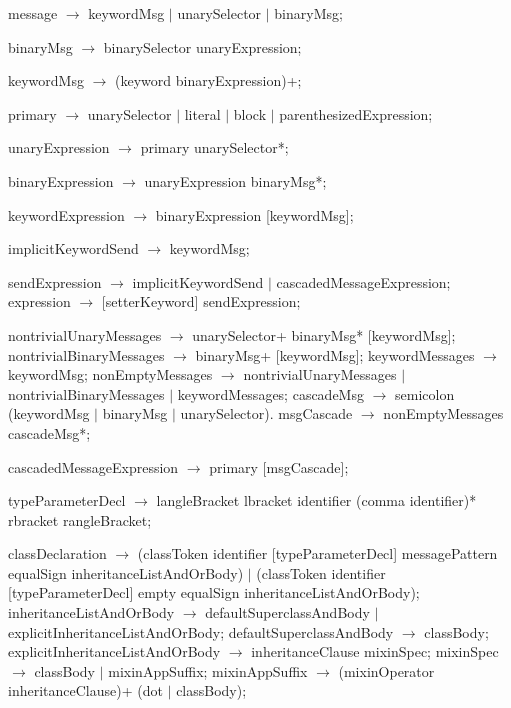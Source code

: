 \documentclass{article}
\begin{document}
\begin{newspeak}
message $\rightarrow$ keywordMsg $|$ unarySelector $|$ binaryMsg;

binaryMsg $\rightarrow$ binarySelector unaryExpression;

keywordMsg $\rightarrow$  (keyword binaryExpression)+;

primary $\rightarrow$  unarySelector $|$
               literal $|$
               block $|$ 
               parenthesizedExpression;
 
unaryExpression $\rightarrow$ primary unarySelector*;

binaryExpression $\rightarrow$  unaryExpression binaryMsg*;

keywordExpression $\rightarrow$  binaryExpression [keywordMsg];

implicitKeywordSend $\rightarrow$ keywordMsg;

sendExpression $\rightarrow$ implicitKeywordSend $|$ cascadedMessageExpression; 
expression $\rightarrow$ [setterKeyword] sendExpression;

nontrivialUnaryMessages $\rightarrow$ unarySelector+ binaryMsg*  [keywordMsg];
nontrivialBinaryMessages $\rightarrow$ binaryMsg+ [keywordMsg];
keywordMessages $\rightarrow$ keywordMsg;
nonEmptyMessages $\rightarrow$ nontrivialUnaryMessages $|$
                             nontrivialBinaryMessages  $|$
                             keywordMessages;
cascadeMsg $\rightarrow$ semicolon (keywordMsg $|$ binaryMsg $|$ unarySelector).
msgCascade $\rightarrow$ nonEmptyMessages cascadeMsg*;
                                                                                                                        
cascadedMessageExpression $\rightarrow$ primary [msgCascade]; 

typeParameterDecl $\rightarrow$ langleBracket lbracket identifier (comma identifier)* rbracket rangleBracket;

classDeclaration $\rightarrow$ (classToken identifier [typeParameterDecl] messagePattern equalSign
                     inheritanceListAndOrBody) $|$
                  (classToken identifier [typeParameterDecl] empty equalSign
                     inheritanceListAndOrBody);
inheritanceListAndOrBody $\rightarrow$ defaultSuperclassAndBody $|$ 
                                     explicitInheritanceListAndOrBody;
defaultSuperclassAndBody $\rightarrow$ classBody;
explicitInheritanceListAndOrBody $\rightarrow$ inheritanceClause mixinSpec;
mixinSpec $\rightarrow$  classBody $|$ mixinAppSuffix;
mixinAppSuffix $\rightarrow$ (mixinOperator inheritanceClause)+  
                      (dot $|$ classBody);
                      

\end{newspeak}
\end{document}
